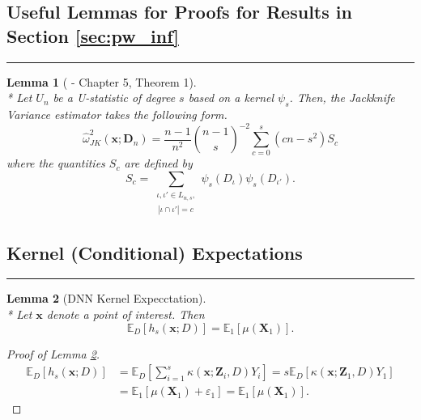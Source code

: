 \documentclass[letterpaper,10pt]{article}
\numberwithin{equation}{section}
\numberwithin{thm}{section}
\newtheorem{lem}{Lemma}
\numberwithin{lem}{section}
\numberwithin{cor}{section}
\renewcommand{\hat}{\widehat}
\newcommand{\E}{\mathbb{E}}
\newcommand{\1}{\mathbbm{1}}
\begin{document}
\subsection{Useful Lemmas for Proofs for Results in Section \ref{sec:pw_inf}}
\hrule

\begin{lem}[\citet{lee_u-statistics_2019} - Chapter 5, Theorem 1]\label{thm:lee_ch5_1}\mbox{}\\*
	Let $U_n$ be a U-statistic of degree $s$ based on a kernel $\psi_s$.
	Then, the Jackknife Variance estimator takes the following form.
	\begin{equation}
		\hat{\omega}^{2}_{JK}\left(\mathbf{x}; \mathbf{D}_n\right)
		= \frac{n-1}{n^2}\binom{n-1}{s}^{-2}\sum_{c = 0}^{s}\left(cn - s^2\right)S_c
	\end{equation}
	where the quantities $S_c$ are defined by
	\begin{equation}
		S_c
		= \sum_{\substack{\iota, \iota' \in L_{n,s}, \\ \, |\iota \cap \iota'| = c}}
		\psi_{s}(D_{\iota})\psi_{s}(D_{\iota'}).
	\end{equation}
\end{lem}

\subsection{Kernel (Conditional) Expectations}
\hrule

\begin{lem}[DNN Kernel Expecctation]\label{lem:DNN_k_exp}\mbox{}\\*
	Let $\mathbf{x}$ denote a point of interest.
	Then
	\begin{equation}
		\E_D\left[h_s\left(\mathbf{x}; D\right)\right]
		= \E_{1}\left[\mu\left(\mathbf{X}_1\right)\right].
	\end{equation}
\end{lem}

\begin{proof}[Proof of Lemma \ref{lem:DNN_k_exp}]
	\begin{equation}
		\begin{aligned}
			\E_D\left[h_s\left(\mathbf{x}; D\right)\right]
			 & = \E_D\left[\sum_{i = 1}^{s} \kappa\left(\mathbf{x}; \mathbf{Z}_i, D\right) Y_i\right]
			= s \E_{D}\left[\kappa\left(\mathbf{x}; \mathbf{Z}_1, D\right) Y_1\right]                 \\
			 & = \E_{1}\left[\mu\left(\mathbf{X}_1\right) + \varepsilon_1\right]
			= \E_{1}\left[\mu\left(\mathbf{X}_1\right)\right].
		\end{aligned}
	\end{equation}
\end{proof}
\end{document}
